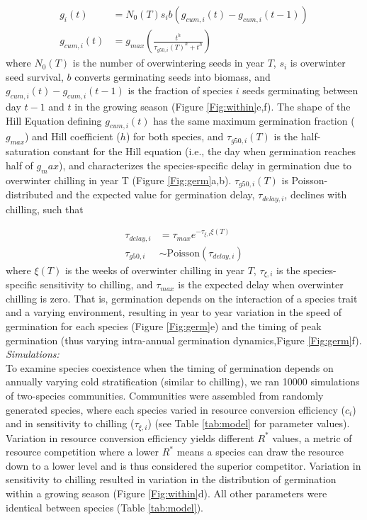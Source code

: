 \documentclass[11pt]{article}
\begin{document}
\begin{align}
g_{i}(t) & = N_{0}(T)s_{i} b (g_{cum,i}(t) - g_{cum,i}(t-1))\\
g_{cum,i}(t) & = g_{max}(\frac{t^h}{\tau_{g50,i}(T)^h + t^h})
\end{align}
where $N_{0}(T)$ is the number of overwintering seeds in year $T$, $s_{i}$ is overwinter seed survival, $b$ converts germinating seeds into biomass, and $g_{cum,i}(t) - g_{cum,i}(t-1)$ is the fraction of species $i$ seeds germinating between day $t-1$ and $t$ in the growing season (Figure \ref{Fig:within}e,f).  The shape of the Hill Equation defining $g_{cum,i}(t)$ has the same maximum germination fraction ($g_{max}$) and Hill coefficient ($h$) for both species, and $\tau_{g50,i}(T)$ is the half-saturation constant for the Hill equation (i.e., the day when germination reaches half of $g_max$), and characterizes the species-specific delay in germination due to overwinter chilling in year T (Figure \ref{Fig:germ}a,b). $\tau_{g50,i}(T)$ is Poisson-distributed and the expected value for germination delay, $\tau_{delay,i}$, declines with chilling, such that

\begin{align}
\tau_{delay,i} & = \tau_{max}e^{-\tau_{\xi,i}\xi(T)} \\
\tau_{g50,i} & \sim \mathrm{Poisson}(\tau_{delay,i})
\end{align}
where $\xi(T)$ is the weeks of overwinter chilling in year $T$, $\tau_{\xi,i}$ is the species-specific sensitivity to chilling, and $\tau_{max}$ is the expected delay when overwinter chilling is zero.  That is, germination depends on the interaction of a species trait and a varying environment, resulting in year to year variation in the speed of germination for each species (Figure \ref{Fig:germ}e) and the timing of peak germination (thus varying intra-annual germination dynamics,Figure \ref{Fig:germ}f). \\

\noindent \emph{Simulations:}\\
To examine species coexistence when the timing of germination depends on annually varying cold stratification (similar to chilling), we ran 10000 simulations of two-species communities.  Communities were assembled from randomly generated species, where each species varied in resource conversion efficiency ($c_i$) and in sensitivity to chilling ($\tau_{\xi,i}$) (see Table \ref{tab:model} for parameter values). Variation in resource conversion efficiency yields different $R^*$ values, a metric of resource competition where a lower $R^*$ means a species can draw the resource down to a lower level and is thus considered the superior competitor.  Variation in sensitivity to chilling resulted in variation in the distribution of germination within a growing season (Figure \ref{Fig:within}d).  All other parameters were identical between species (Table \ref{tab:model}). \\
\end{document}
